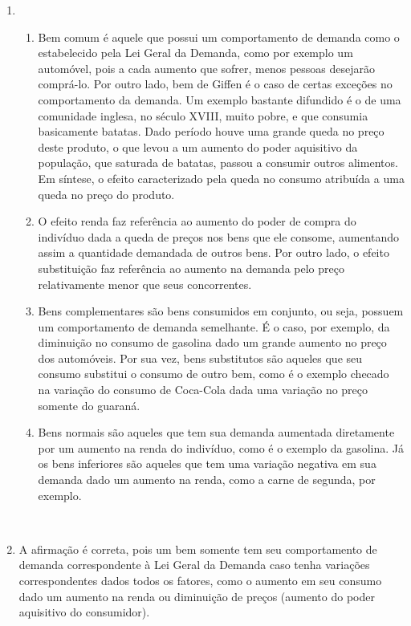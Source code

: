 \documentclass[a4paper, 12pt]{article}
\begin{document}
\begin{enumerate}
	\item
	\begin{enumerate}
		\item Bem comum é aquele que possui um comportamento de demanda como o estabelecido pela Lei Geral da Demanda, como por exemplo um automóvel, pois a cada aumento que sofrer, menos pessoas desejarão comprá-lo. Por outro lado, bem de Giffen é o caso de certas exceções no comportamento da demanda. Um exemplo bastante difundido é o de uma comunidade inglesa, no século XVIII, muito pobre, e que consumia basicamente batatas. Dado período houve uma grande queda no preço deste produto, o que levou a um aumento do poder aquisitivo da população, que saturada de batatas, passou a consumir outros alimentos. Em síntese, o efeito caracterizado pela queda no consumo atribuída a uma queda no preço do produto.\\

		\item O efeito renda faz referência ao aumento do poder de compra do indivíduo dada a queda de preços nos bens que ele consome, aumentando assim a quantidade demandada de outros bens. Por outro lado, o efeito substituição faz referência ao aumento na demanda pelo preço relativamente menor que seus concorrentes.\\

		\item Bens complementares são bens consumidos em conjunto, ou seja, possuem um comportamento de demanda semelhante. É o caso, por exemplo, da diminuição no consumo de gasolina dado um grande aumento no preço dos automóveis. Por sua vez, bens substitutos são aqueles que seu consumo substitui o consumo de outro bem, como é o exemplo checado na variação do consumo de Coca-Cola dada uma variação no preço somente do guaraná.\\

		\item Bens normais são aqueles que tem sua demanda aumentada diretamente por um aumento na renda do indivíduo, como é o exemplo da gasolina. Já os bens inferiores são aqueles que tem uma variação negativa em sua demanda dado um aumento na renda, como a carne de segunda, por exemplo.\\
	\end{enumerate}
	\\

	\item A afirmação é correta, pois um bem somente tem seu comportamento de demanda correspondente à Lei Geral da Demanda caso tenha variações correspondentes dados todos os fatores, como o aumento em seu consumo dado um aumento na renda ou diminuição de preços (aumento do poder aquisitivo do consumidor).
	\\


\end{enumerate}
\end{document}
